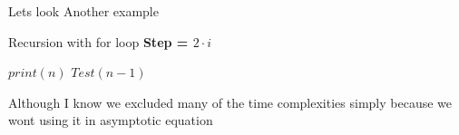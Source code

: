 \documentclass[]{article}
\begin{document}
Lets look Another example
\begin{algorithm}[H]
    \caption{Recursion with for loop \textbf{Step = $2 \cdot i$} }
    \label{printRecursion}
    \begin{algorithmic}
         
             
                \State$print(n)$ 
            \EndFor
            \State$Test(n-1)$   
        \EndIf
        \EndProcedure
    \end{algorithmic}
\end{algorithm}

Although I know we excluded many of the time complexities simply because we wont using it in asymptotic equation
\end{document}
